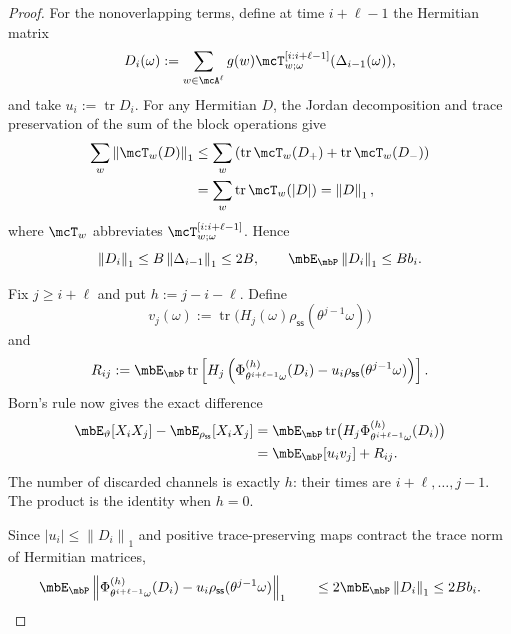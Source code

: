 \documentclass[a4paper]{article}
\numberwithin{equation}{section}   %
\theoremstyle{plain}   %
\theoremstyle{plain}   %
\theoremstyle{examplestyle}
\DeclareMathOperator{\pr}{\mbP}           %
\newcommand{\s}{\rho_{\mathsf{ss}}}     %
\DeclareMathOperator{\str}{tr} %
\newcommand{\unorm}[1]{\left\lVert#1\right\rVert}
\begin{document}
\begin{proof}
    For the nonoverlapping terms, define at time $i+\ell-1$ the Hermitian matrix
    \[
        D_i(\omega)
        :=
        \sum_{w\in\mcA^\ell}
            g(w)
            \mcT^{[i:i+\ell-1]}_{w;\omega}
                (\Delta_{i-1}(\omega)),
    \]
    and take $u_i:=\str D_i$. 
    For any Hermitian $D$, the Jordan decomposition and trace preservation of the sum of the block operations give
    \[
        \begin{aligned}
            \sum_w\unorm{\mcT_w(D)}_1
            &\le
            \sum_w
                \left(
                    \str\mcT_w(D_+)
                    +
                    \str\mcT_w(D_-)
                \right)\\
            &=
            \sum_w\str\mcT_w(|D|)
            =
            \unorm D_1,
        \end{aligned}
    \]
    where $\mcT_w$ abbreviates  $\mcT^{[i:i+\ell-1]}_{w;\omega}$.
    Hence
    \[
        \unorm{D_i}_1
        \le B\unorm{\Delta_{i-1}}_1
        \le2B,
        \qquad
        \mbE_{\pr}\unorm{D_i}_1\le Bb_i.
    \]

    Fix $j\ge i+\ell$ and put $h:=j-i-\ell$.
    Define
    \[
        v_j(\omega)
        :=
        \str\bigl(
            H_j(\omega)\s(\theta^{j-1}\omega)
        \bigr)
    \]
    and
    \[
        R_{ij}
        :=
        \mbE_{\pr}\str\left[
            H_j
            \left(
                \Phi^{(h)}_{\theta^{i+\ell-1}\omega}(D_i)
                -
                u_i\s(\theta^{j-1}\omega)
            \right)
        \right].
    \]
    Born's rule now gives the exact difference
    \begin{align}
    \label{univ:eq:pairdifference}
        \mbE_\vartheta[X_iX_j]
        -
        \mbE_{\s}[X_iX_j]
        &=
        \mbE_{\pr}\str\bigl(
            H_j
            \Phi^{(h)}_{\theta^{i+\ell-1}\omega}(D_i)
        \bigr)
        \nonumber\\
        &=
        \mbE_{\pr}[u_i v_j]+R_{ij}.
    \end{align}
    The number of discarded channels is exactly $h$: their times are $i+\ell,\ldots,j-1$.
    The product is the identity when $h=0$.

    Since $|u_i|\le\unorm{D_i}_1$ and positive trace-preserving maps contract the trace norm of
    Hermitian matrices,
    \[
        \mbE_{\pr}
        \unorm{
            \Phi^{(h)}_{\theta^{i+\ell-1}\omega}(D_i)
            -
            u_i\s(\theta^{j-1}\omega)
        }_1
        \qquad\le
        2\mbE_{\pr}\unorm{D_i}_1
        \le2Bb_i.
    \]


\end{proof}
\end{document}
